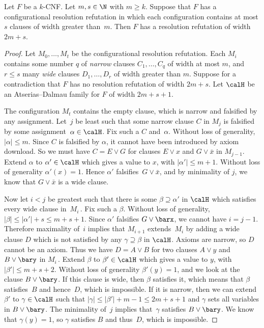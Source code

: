 \documentclass{toc}
\begin{document}
\begin{theorem} \label{thm:total_space}
Let $F$ be a $k$-CNF.
Let $m, s \in \N$ with $m \ge k$.
Suppose that $F$ has a configurational resolution refutation in which
 each configuration
contains at most $s$ clauses of width greater than~$m$.
Then $F$ has a resolution refutation of width $2m+s$.
\end{theorem}

\begin{proof}
Let $M_0, \dots, M_t$ be the configurational resolution refutation. 
Each  $M_i$  contains some number $q$ of \emph{narrow} clauses 
$C_1, \dots, C_q$ of width at most $m$,
and $r \le s$ 
many \emph{wide} clauses $D_1, \dots, D_r$ of width greater than $m$.
Suppose
for a contradiction that $F$ has no resolution refutation of width $2m+s$. Let 
$\calH$ be an  Atserias--Dalmau family for $F$ of width $2m+s+1$.

The configuration $M_t$ contains the empty clause, which is narrow and falsified by any assignment.
Let~$j$ be least such that some narrow clause
$C$ in $M_j$ is falsified by some assignment~$\alpha \in \calH$. Fix such a $C$ and~$\alpha$.
Without loss of generality, $|\alpha|\le m$.
Since $C$ is falsified by $\alpha$, it cannot have been introduced by axiom download.
So we must have $C = E \vee G$ for clauses $E \vee x$ and $G \vee \bar{x}$ in $M_{j-1}$.
Extend $\alpha$ to $\alpha' \in \calH$ which gives a value to $x$, with $|\alpha'| \le m+1$. Without loss of
generality $\alpha'(x)=1$. Hence $\alpha'$ falsifies~$G \vee \bar{x}$, and by minimality
of $j$, we know that $G \vee \bar{x}$ is a wide clause.


Now let $i<j$ be greatest such that there is some $\beta \supseteq \alpha'$ in $\calH$ which
satisfies every wide clause in~$M_i$\,. Fix such a $\beta$. Without loss of generality,
 $|\beta| \le |\alpha'|+s \le m +s + 1$.
Since $\alpha'$ falsifies $G \vee \barx$,
we cannot have $i=j-1$. Therefore maximality of~$i$ implies that $M_{i+1}$ extends~$M_i$ by adding a
wide clause $D$ which is not satisfied by any $\gamma \supseteq \beta$ in $\calH$.
Axioms are narrow, so $D$ cannot be an axiom.
Thus we have $D = A \vee B$
for two clauses $A \vee y$ and $B \vee \bary$ in $M_i$\,.
Extend $\beta$ to $\beta' \in \calH$ which gives a value to $y$, with $|\beta'|\le m+s+2$.
Without loss of generality $\beta'(y)=1$, and we look at the clause $B \vee \bary$.
If this clause is wide, then $\beta$ satisfies it, which means that $\beta$ satisfies~$B$ and hence~$D$,
which is impossible. If it is narrow, then we can extend $\beta'$ to $\gamma \in \calH$
such that $|\gamma| \le |\beta'| + m - 1 \le 2m + s + 1$ and $\gamma$
sets all variables in $B \vee \bary$. The minimality of~$j$ implies that~$\gamma$
satisfies $B \vee \bary$. We know that $\gamma(y) = 1$, 
so $\gamma$ satisfies $B$ and thus~$D$, which is impossible.
\end{proof}
\end{document}
